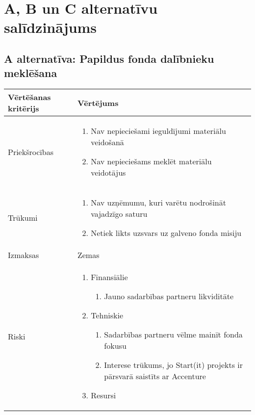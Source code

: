\section{A, B un C alternatīvu salīdzinājums}
\label{app:ABCsalidzinajums}
\subsection*{A alternatīva: Papildus fonda dalībnieku meklēšana}
\begin{table}[!ht]
    \centering
    \begin{tabular}{|l|p{11.5cm}|}
        \hline
        \textbf{Vērtēšanas kritērijs} & \textbf{Vērtējums} \\
        \hline
        Priekšrocības & \begin{enumerate}
            \item Nav nepieciešami ieguldījumi materiālu veidošanā
            \item Nav nepieciešams meklēt materiālu veidotājus
        \end{enumerate} \\
        \hline 
        Trūkumi &  \begin{enumerate}
            \item Nav uzņēmumu, kuri varētu nodrošināt vajadzīgo saturu
            \item Netiek likts uzsvars uz galveno fonda misiju
        \end{enumerate}\\
        \hline 
        Izmaksas & Zemas \\
        \hline
        Riski &  \begin{enumerate}
            \item Finansiālie
            \begin{enumerate}
                \item Jauno sadarbības partneru likviditāte
            \end{enumerate}
            \item Tehniskie
            \begin{enumerate}
                \item Sadarbības partneru vēlme mainīt fonda fokusu
                \item Interese trūkums, jo Start(it) projekts ir pārsvarā saistīts ar Accenture
            \end{enumerate}
            \item Resursi
            \begin{enumerate}

\end{enumerate}
\end{enumerate}
\end{tabular}
\end{table}
